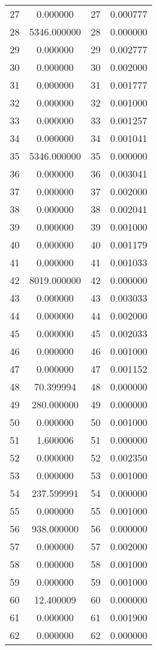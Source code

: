 \documentclass[12pt]{article}
\begin{document}
\begin{longtable}{@{}cccc@{}}
27 & 0.000000 & 27 & 0.000777 \\
28 & 5346.000000 & 28 & 0.000000 \\
29 & 0.000000 & 29 & 0.002777 \\
30 & 0.000000 & 30 & 0.002000 \\
31 & 0.000000 & 31 & 0.001777 \\
32 & 0.000000 & 32 & 0.001000 \\
33 & 0.000000 & 33 & 0.001257 \\
34 & 0.000000 & 34 & 0.001041 \\
35 & 5346.000000 & 35 & 0.000000 \\
36 & 0.000000 & 36 & 0.003041 \\
37 & 0.000000 & 37 & 0.002000 \\
38 & 0.000000 & 38 & 0.002041 \\
39 & 0.000000 & 39 & 0.001000 \\
40 & 0.000000 & 40 & 0.001179 \\
41 & 0.000000 & 41 & 0.001033 \\
42 & 8019.000000 & 42 & 0.000000 \\
43 & 0.000000 & 43 & 0.003033 \\
44 & 0.000000 & 44 & 0.002000 \\
45 & 0.000000 & 45 & 0.002033 \\
46 & 0.000000 & 46 & 0.001000 \\
47 & 0.000000 & 47 & 0.001152 \\
48 & 70.399994 & 48 & 0.000000 \\
49 & 280.000000 & 49 & 0.000000 \\
50 & 0.000000 & 50 & 0.001000 \\
51 & 1.600006 & 51 & 0.000000 \\
52 & 0.000000 & 52 & 0.002350 \\
53 & 0.000000 & 53 & 0.001000 \\
54 & 237.599991 & 54 & 0.000000 \\
55 & 0.000000 & 55 & 0.001000 \\
56 & 938.000000 & 56 & 0.000000 \\
57 & 0.000000 & 57 & 0.002000 \\
58 & 0.000000 & 58 & 0.001000 \\
59 & 0.000000 & 59 & 0.001000 \\
60 & 12.400009 & 60 & 0.000000 \\
61 & 0.000000 & 61 & 0.001900 \\
62 & 0.000000 & 62 & 0.000000 \\

\end{longtable}
\end{document}
